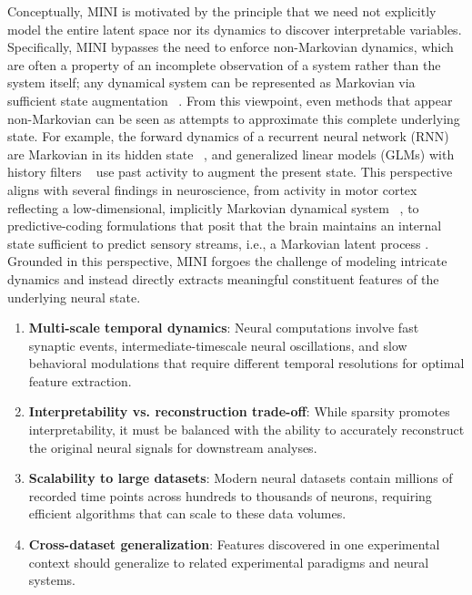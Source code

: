 Conceptually, MINI is motivated by the principle that we need not explicitly model the entire latent space nor its dynamics to discover interpretable variables. Specifically, MINI bypasses the need to enforce non-Markovian dynamics, which are often a property of an incomplete observation of a system rather than the system itself; any dynamical system can be represented as Markovian via sufficient state augmentation ~\cite{takens_1981_embedding}. From this viewpoint, even methods that appear non-Markovian can be seen as attempts to approximate this complete underlying state. For example, the forward dynamics of a recurrent neural network (RNN) are Markovian in its hidden state ~\cite{sussillo_2013_rnn_dynamics, goodfellow_2016_rnn}, and generalized linear models (GLMs) with history filters ~\cite{pillow_2008_glms, truccolo_2005_pointprocess} use past activity to augment the present state. This perspective aligns with several findings in neuroscience, from activity in motor cortex reflecting a low-dimensional, implicitly Markovian dynamical system ~\cite{churchland_2012_population_dynamics}, to predictive-coding formulations that posit that the brain maintains an internal state sufficient to predict sensory streams, i.e., a Markovian latent process \cite{rao_1999_predictive_coding, doya_2007_bayesian_brain, friston_2010_free_energy}. Grounded in this perspective, MINI forgoes the challenge of modeling intricate dynamics and instead directly extracts meaningful constituent features of the underlying neural state.



\begin{enumerate}
\item \textbf{Multi-scale temporal dynamics}: Neural computations involve fast synaptic events, intermediate-timescale neural oscillations, and slow behavioral modulations that require different temporal resolutions for optimal feature extraction.

\item \textbf{Interpretability vs. reconstruction trade-off}: While sparsity promotes interpretability, it must be balanced with the ability to accurately reconstruct the original neural signals for downstream analyses.

\item \textbf{Scalability to large datasets}: Modern neural datasets contain millions of recorded time points across hundreds to thousands of neurons, requiring efficient algorithms that can scale to these data volumes.

\item \textbf{Cross-dataset generalization}: Features discovered in one experimental context should generalize to related experimental paradigms and neural systems.
\end{enumerate}

